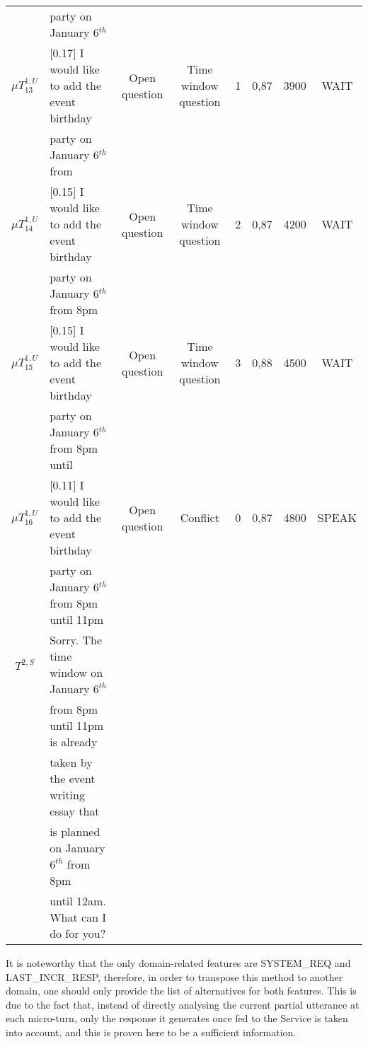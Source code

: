 \begin{sidewaystable}
\begin{tabular}{|c|l|c|c|c|c|c|c|}
						& party on January 6$^{th}$ & & & & & & \\
						$\mu T^{1,U}_{13}$ & [0.17] I would like to add the event birthday & Open question & Time window question & 1 & 0,87 & 3900 & WAIT \\
						& party on January 6$^{th}$ from & & & & & & \\
						$\mu T^{1,U}_{14}$ & [0.15] I would like to add the event birthday & Open question & Time window question & 2 & 0,87 & 4200 & WAIT \\
						& party on January 6$^{th}$ from 8pm & & & & & & \\
						$\mu T^{1,U}_{15}$ & [0.15] I would like to add the event birthday & Open question & Time window question & 3 & 0,88 & 4500 & WAIT \\
						& party on January 6$^{th}$ from 8pm until & & & & & & \\
						$\mu T^{1,U}_{16}$ & [0.11] I would like to add the event birthday & Open question & Conflict & 0 & 0,87 & 4800 & SPEAK \\
						& party on January 6$^{th}$ from 8pm until 11pm & & & & & & \\
						\hline
						$T^{2,S}$ & Sorry. The time window on January $6^{th}$ & & & & & & \\
						& from 8pm until 11pm is already & & & & & & \\
						& taken by the event writing essay that & & & & & & \\
						& is planned on January $6^{th}$ from 8pm & & & & & & \\
						& until 12am. What can I do for you? & & & & & & \\
						\hline
					\end{tabular}
					\caption{Dialogue example with state representation features' values.}
					\label{tab:dialexfeat}
				\end{sidewaystable}

        It is noteworthy that the only domain-related features are SYSTEM\_REQ and \\ LAST\_INCR\_RESP, therefore, in order to transpose this method to another domain, one should only provide the list of alternatives for both features. This is due to the fact that, instead of directly analysing the current partial utterance at each micro-turn, only the response it generates once fed to the Service is taken into account, and this is proven here to be a sufficient information.
        

